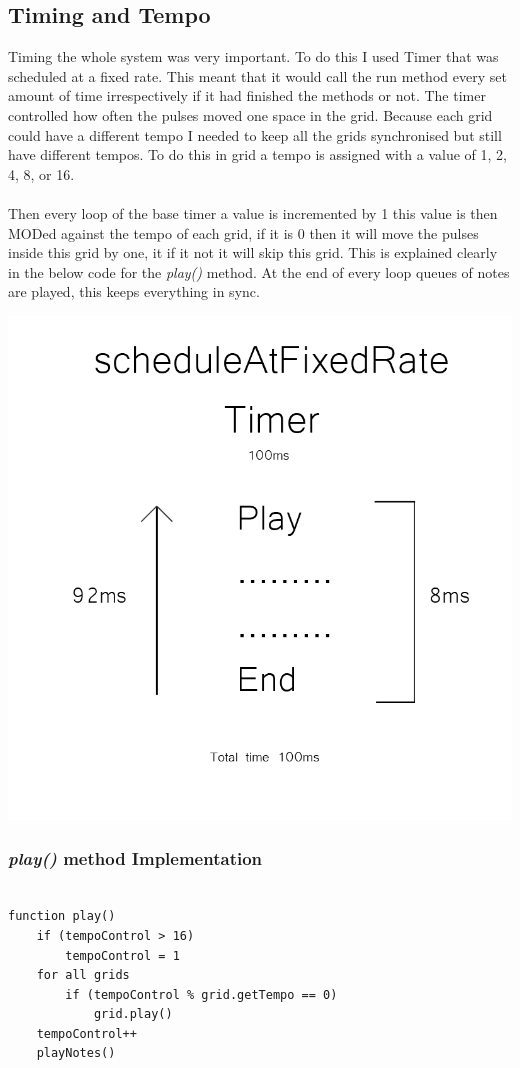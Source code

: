 \documentclass[10pt,a4paper]{article}
\begin{document}
\subsection{Timing and Tempo}
Timing the whole system was very important. To do this I used Timer that was scheduled at a fixed rate. This meant that it would call the run method every set amount of time irrespectively if it had finished the methods or not. The timer controlled how often the pulses moved one space in the grid. Because each grid could have a different tempo I needed to keep all the grids synchronised but still have different tempos. To do this in grid a tempo is assigned with a value of 1, 2, 4, 8, or 16.\\
\\
Then every loop of the base timer a value is incremented by 1 this value is then MODed against the tempo of each grid, if it is 0 then it will move the pulses inside this grid by one, it if it not it will skip this grid. This is explained clearly in the below code for the \textit{play()} method. At the end of every loop queues of notes are played, this keeps everything in sync.\\
\begin{center}
\includegraphics[scale=0.2]{utimer.png}
\end{center}
\subsubsection{\textit{play()} method Implementation}
\begin{center}
\begin{verbatim}

function play() 
    if (tempoControl > 16) 
        tempoControl = 1 
    for all grids 
        if (tempoControl % grid.getTempo == 0) 
            grid.play() 
    tempoControl++
    playNotes() 
	
\end{verbatim}
\end{center}
\end{document}
